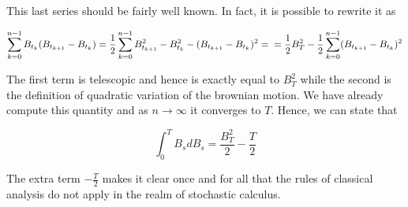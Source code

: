 This last series should be fairly well known. In fact, it is possible to rewrite it as 

\begin{equation*}
    \sum_{k=0}^{n-1} B_{t_k} (B_{t_{k+1}}-B_{t_k}) = \frac{1}{2} \sum_{k=0}^{n-1} B_{t_{k+1}}^2 - B_{t_k}^2 - (B_{t_{k+1}}-B_{t_k})^2 = \\
    = \frac{1}{2} B_T^2 - \frac{1}{2} \sum_{k=0}^{n-1} (B_{t_{k+1}} - B_{t_k})^2
\end{equation*}

The first term is telescopic and hence is exactly equal to $B_T^2$ while the second is the definition of quadratic variation of the brownian motion. We have already compute this quantity and as $n \to \infty$ it converges to $T$. Hence, we can state that

\begin{equation*}
    \int_0^T B_s dB_s = \frac{B_T^2}{2} - \frac{T}{2}
\end{equation*}

The extra term $-\frac{T}{2}$ makes it clear once and for all that the rules of classical analysis do not apply in the realm of stochastic calculus. 